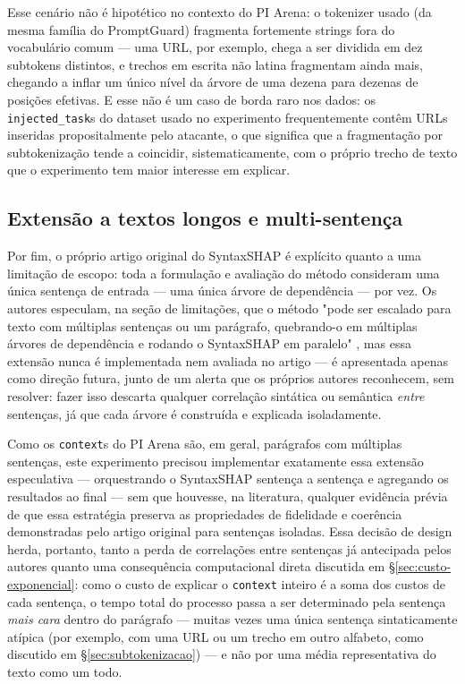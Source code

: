\documentclass{article}
\begin{document}
Esse cenário não é hipotético no contexto do PI Arena: o tokenizer usado (da mesma família do PromptGuard) fragmenta fortemente strings fora do vocabulário comum — uma URL, por exemplo, chega a ser dividida em dez subtokens distintos, e trechos em escrita não latina fragmentam ainda mais, chegando a inflar um único nível da árvore de uma dezena para dezenas de posições efetivas. E esse não é um caso de borda raro nos dados: os \texttt{injected\_task}s do dataset usado no experimento frequentemente contêm URLs inseridas propositalmente pelo atacante, o que significa que a fragmentação por subtokenização tende a coincidir, sistematicamente, com o próprio trecho de texto que o experimento tem maior interesse em explicar.

\subsection{Extensão a textos longos e multi-sentença}
\label{sec:contexto-longo}

Por fim, o próprio artigo original do SyntaxSHAP é explícito quanto a uma limitação de escopo: toda a formulação e avaliação do método consideram uma única sentença de entrada — uma única árvore de dependência — por vez. Os autores especulam, na seção de limitações, que o método "pode ser escalado para texto com múltiplas sentenças ou um parágrafo, quebrando-o em múltiplas árvores de dependência e rodando o SyntaxSHAP em paralelo" \parencite{amara2024syntaxshap}, mas essa extensão nunca é implementada nem avaliada no artigo — é apresentada apenas como direção futura, junto de um alerta que os próprios autores reconhecem, sem resolver: fazer isso descarta qualquer correlação sintática ou semântica \emph{entre} sentenças, já que cada árvore é construída e explicada isoladamente.

Como os \texttt{context}s do PI Arena são, em geral, parágrafos com múltiplas sentenças, este experimento precisou implementar exatamente essa extensão especulativa — orquestrando o SyntaxSHAP sentença a sentença e agregando os resultados ao final — sem que houvesse, na literatura, qualquer evidência prévia de que essa estratégia preserva as propriedades de fidelidade e coerência demonstradas pelo artigo original para sentenças isoladas. Essa decisão de design herda, portanto, tanto a perda de correlações entre sentenças já antecipada pelos autores quanto uma consequência computacional direta discutida em \S\ref{sec:custo-exponencial}: como o custo de explicar o \texttt{context} inteiro é a soma dos custos de cada sentença, o tempo total do processo passa a ser determinado pela sentença \emph{mais cara} dentro do parágrafo — muitas vezes uma única sentença sintaticamente atípica (por exemplo, com uma URL ou um trecho em outro alfabeto, como discutido em \S\ref{sec:subtokenizacao}) — e não por uma média representativa do texto como um todo.

\printbibliography
\end{document}
